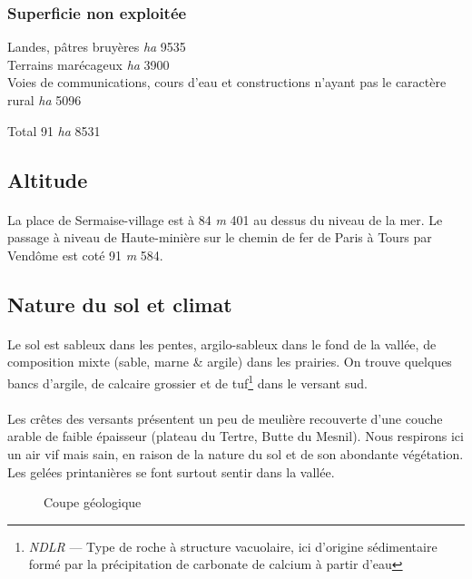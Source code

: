 \documentclass[../eBook.tex]{subfiles}
\begin{document}
    \subsubsection*{Superficie non exploitée}
      \begin{flushleft}
        Landes, pâtres bruyères \textit{ha} 9535\\
        Terrains marécageux \textit{ha} 3900\\
        Voies de communications, cours d'eau et constructions\linebreak{} n'ayant pas le caractère rural \textit{ha} 5096\\
      \end{flushleft}
      \hfill Total\makebox[2cm]{\dotfill} 91 \textit{ha} 8531

  \subsection*{Altitude}
    \paragraph{}La place de Sermaise-village est à 84 \textit{m} 401 au dessus du niveau de la mer. Le passage à niveau de Haute-minière sur le chemin de fer de Paris à Tours par Vendôme est coté 91 \textit{m} 584.

  \subsection*{Nature du sol et climat}
    \paragraph{}Le sol est sableux dans les pentes, argilo-sableux dans le fond de la vallée, de composition mixte (sable, marne \& argile) dans les prairies. On trouve quelques bancs d'argile, de calcaire grossier et de tuf\footnote{\textit{NDLR} --- Type de roche à structure vacuolaire, ici d'origine sédimentaire formé par la précipitation de carbonate de calcium à partir d'eau} dans le versant sud.
    \paragraph{}Les crêtes des versants présentent un peu de meulière recouverte d'une couche arable de faible épaisseur (plateau du Tertre, Butte du Mesnil). Nous respirons ici un air vif mais sain, en raison de la nature du sol et de son abondante végétation. Les gelées printanières se font surtout sentir dans la vallée.
    \begin{center}
      \begin{figure}[!ht]
        \caption*{Coupe géologique}
      \end{figure}
    \end{center}
\end{document}
